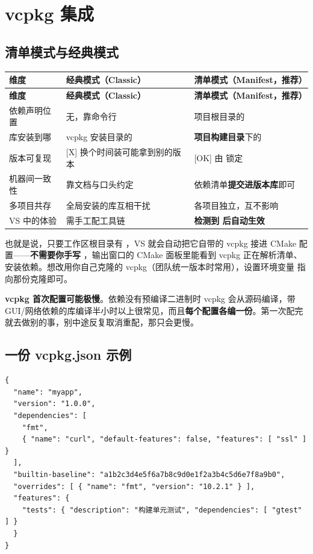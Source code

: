 \section{vcpkg 集成}
\subsection{清单模式与经典模式}
\begin{longtable}{L{2.6cm}L{5.4cm}L{6.6cm}}
\toprule \textbf{维度} & \textbf{经典模式（Classic）} & \textbf{清单模式（Manifest，推荐）} \\ \midrule
\endfirsthead
\toprule \textbf{维度} & \textbf{经典模式（Classic）} & \textbf{清单模式（Manifest，推荐）} \\ \midrule
\endhead
\bottomrule \endlastfoot
依赖声明位置 & 无，靠命令行  & 项目根目录的 \textbf{} \\
库安装到哪 & vcpkg 安装目录的  & \textbf{项目构建目录}下的  \\
版本可复现 & [X] 换个时间装可能拿到别的版本 & [OK] 由  锁定 \\
机器间一致性 & 靠文档与口头约定 & 依赖清单\textbf{提交进版本库}即可 \\
多项目共存 & 全局安装的库互相干扰 & 各项目独立，互不影响 \\
VS 中的体验 & 需手工配工具链 & \textbf{检测到  后自动生效} \\
\end{longtable}
也就是说，只要工作区根目录有 ，VS 就会自动把它自带的 vcpkg 接进 CMake 配置——\textbf{不需要你手写 }，输出窗口的 CMake 面板里能看到 vcpkg 正在解析清单、安装依赖。想改用你自己克隆的 vcpkg（团队统一版本时常用），设置环境变量 \textbf{} 指向那份克隆即可。

\begin{warnbox}[注意]
\textbf{vcpkg 首次配置可能极慢}。依赖没有预编译二进制时 vcpkg 会从源码编译，带 GUI/网络依赖的库编译半小时以上很常见，而且\textbf{每个配置各编一份}。第一次配完就去做别的事，别中途反复取消重配，那只会更慢。
\end{warnbox}

\subsection{一份 vcpkg.json 示例}
\begin{lstlisting}[style=jsonstyle]
{
  "name": "myapp",
  "version": "1.0.0",
  "dependencies": [
    "fmt",
    { "name": "curl", "default-features": false, "features": [ "ssl" ] }
  ],
  "builtin-baseline": "a1b2c3d4e5f6a7b8c9d0e1f2a3b4c5d6e7f8a9b0",
  "overrides": [ { "name": "fmt", "version": "10.2.1" } ],
  "features": {
    "tests": { "description": "构建单元测试", "dependencies": [ "gtest" ] }
  }
}
\end{lstlisting}


